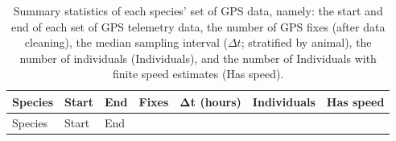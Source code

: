 \documentclass[
  12pt,
]{article}
\begin{document}
\begin{longtable}[]{@{}
  >{\raggedright\arraybackslash}p{}
  >{\raggedright\arraybackslash}p{}
  >{\raggedright\arraybackslash}p{}
  >{\raggedleft\arraybackslash}p{}
  >{\raggedleft\arraybackslash}p{}
  >{\raggedleft\arraybackslash}p{}
  >{\raggedleft\arraybackslash}p{}@{}}
\caption{\label{tab:data-table}Summary statistics of each species' set of GPS data, namely: the start and end of each set of GPS telemetry data, the number of GPS fixes (after data cleaning), the median sampling interval (\(\Delta t\); stratified by animal), the number of individuals (Individuals), and the number of Individuals with finite speed estimates (Has speed).}\tabularnewline
\toprule\noalign{}
\begin{minipage}[b]{\linewidth}\raggedright
Species
\end{minipage} & \begin{minipage}[b]{\linewidth}\raggedright
Start
\end{minipage} & \begin{minipage}[b]{\linewidth}\raggedright
End
\end{minipage} & \begin{minipage}[b]{\linewidth}\raggedleft
Fixes
\end{minipage} & \begin{minipage}[b]{\linewidth}\raggedleft
Δt (hours)
\end{minipage} & \begin{minipage}[b]{\linewidth}\raggedleft
Individuals
\end{minipage} & \begin{minipage}[b]{\linewidth}\raggedleft
Has speed
\end{minipage} \\
\midrule\noalign{}
\endfirsthead
\toprule\noalign{}
\begin{minipage}[b]{\linewidth}\raggedright
Species
\end{minipage} & \begin{minipage}[b]{\linewidth}\raggedright
Start
\end{minipage} & \begin{minipage}[b]{\linewidth}\raggedright
End
\end{minipage} & \begin{minipage}[b]{\linewidth}\raggedleft

\end{minipage}
\end{longtable}
\end{document}
